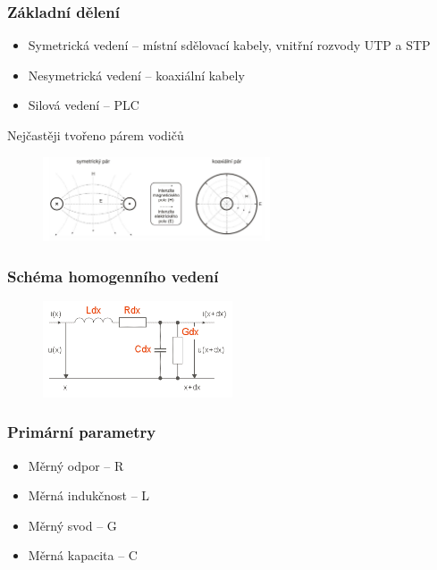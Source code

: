 \subsubsection{Základní dělení}

\begin{itemize}
    \item Symetrická vedení -- místní sdělovací kabely, vnitřní rozvody UTP a STP
    \item Nesymetrická vedení -- koaxiální kabely
    \item Silová vedení -- PLC 
\end{itemize}

Nejčastěji tvořeno párem vodičů

\begin{figure}[h]
    \centering
    \includegraphics[width=0.6\textwidth]{images/060.png}
\end{figure}

\subsubsection{Schéma homogenního vedení}

\begin{figure}[h]
    \centering
    \includegraphics[width=0.5\textwidth]{images/061.png}
\end{figure}

\subsubsection{Primární parametry}
\begin{itemize}
    \item Měrný odpor -- R
    \item Měrná indukčnost -- L
    \item Měrný svod -- G
    \item Měrná kapacita -- C
\end{itemize}


